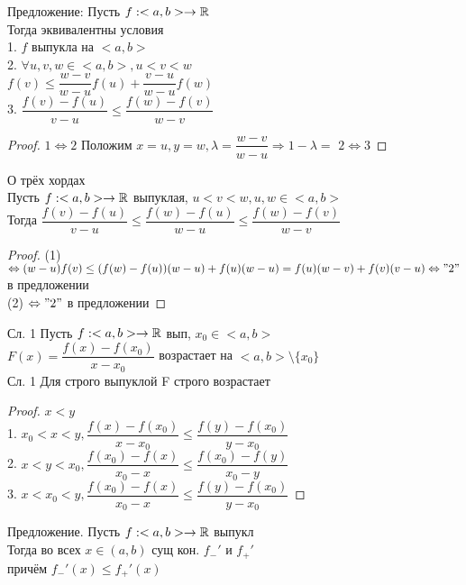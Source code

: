 Предложение: Пусть $ f : <a,b> \rightarrow \mathbb{R} $ \\
Тогда эквивалентны условия \\
1. $ f $ выпукла на $ <a,b> $ \\
2. $ \forall u, v, w \in <a,b> , u < v < w $ \\
$ f(v) \leq \dfrac{w - v}{w - u} f(u) + \dfrac{v - u}{w - u} f(w) $ \\
3. $\dfrac{f(v) - f(u)}{v - u} \leq \dfrac{f(w) - f(v)}{w - v}$
\begin{proof}
	$ 1 \Leftrightarrow 2$ Положим $ x = u, y = w, \lambda = \dfrac{w - v}{w - u} \Rightarrow 1 - \lambda = $ 
	$ 2 \Leftrightarrow 3 $ 
\end{proof}
\begin{lemma}
	О трёх хордах \\
	Пусть $ f : <a,b> \rightarrow \mathbb{R} $ выпуклая, $ u < v < w, u, w \in <a,b>$ \\
	Тогда $ \dfrac{f(v) - f(u)}{v - u} \leq \dfrac{f(w) - f(u)}{w- u} \leq \dfrac{f(w)- f(v)}{w - v} $ \\
	\begin{proof}
		(1) $ \Leftrightarrow (w - u) f(v) \leq (f(w) - f(u))(w - u) + f(u) (w- u) = f(u) (w - v) + f(v) (v - u) \Leftrightarrow "2" $ в предложении \\
		(2) $ \Leftrightarrow "2" $ в предложении
	\end{proof}
\end{lemma}
Сл. 1 Пусть $ f : <a,b> \rightarrow \mathbb{R}$ вып, $ x_0 \in <a,b> $ \\
$ F (x) = \dfrac{f(x) - f(x_0)}{x - x_0} $ возрастает на $ <a,b> \setminus \{x_0\} $ \\
Сл. 1 Для строго выпуклой F строго возрастает \\
\begin{proof}
	$ x < y $ \\
	1. $ x_0 < x < y,  \dfrac{f(x) - f(x_0)}{x - x_0}  \leq \dfrac{f(y) - f(x_0)}{y - x_0} $ \\
	2. $ x < y < x_0, \dfrac{f(x_0) - f(x)}{x_0 - x}  \leq \dfrac{f(x_0) - f(y)}{x_0 - y}  $ \\
	3. $ x < x_0 < y, \dfrac{f(x_0) - f(x)}{x_0 - x} \leq  \dfrac{f(y) - f(x_0)}{y - x_0} $ 
\end{proof}
Предложение. Пусть $ f : <a,b> \rightarrow \mathbb{R} $ выпукл \\
Тогда во всех $ x \in (a, b) $ сущ кон. $ f_-' $ и $ f_+' $ \\
причём $ f_-' (x) \leq f_+'(x) $ \\

